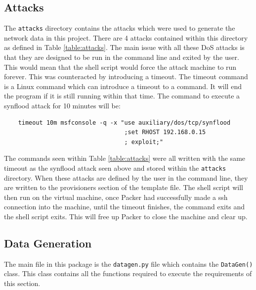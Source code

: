 \subsection{Attacks}
The \texttt{attacks} directory contains the attacks which were used to generate the network data in this project. There are 4 attacks contained within this directory as defined in Table \ref{table:attacks}. The main issue with all these DoS attacks is that they are designed to be run in the command line and exited by the user. This would mean that the shell script would force the attack machine to run forever. This was counteracted by introducing a timeout. The timeout command is a Linux command which can introduce a timeout to a command. It will end the program if it is still running within that time. The command to execute a synflood attack for 10 minutes will be:
\begin{verbatim}
    timeout 10m msfconsole -q -x "use auxiliary/dos/tcp/synflood
                                  ;set RHOST 192.168.0.15
                                  ; exploit;"
\end{verbatim}
    
The commands seen within Table \ref{table:attacks} were all written with the same timeout as the synflood attack seen above and stored within the \texttt{attacks} directory. When these attacks are defined by the user in the command line, they are written to the provisioners section of the template file. The shell script will then run on the virtual machine, once Packer had successfully made a ssh connection into the machine, until the timeout finishes, the command exits and the shell script exits. This will free up Packer to close the machine and clear up.

\subsection{Data Generation}
The main file in this package is the \texttt{datagen.py} file which contains the \texttt{DataGen()} class. This class contains all the functions required to execute the requirements of this section.

